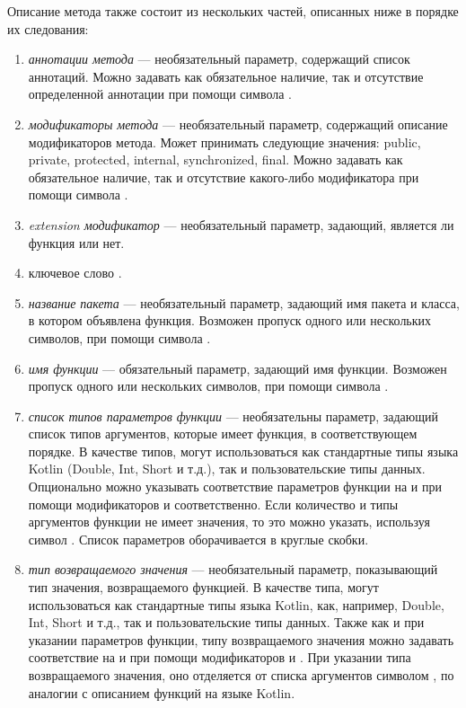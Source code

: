 Описание метода также состоит из нескольких частей, описанных ниже в порядке их
следования:
\begin{enumerate}
	\item \textit{аннотации метода} --- необязательный параметр, содержащий
		  список аннотаций.
		  Можно задавать как обязательное наличие, так и отсутствие определенной
		  аннотации при помощи символа \quotes{!}.
	\item \textit{модификаторы метода} --- необязательный параметр, содержащий
		  описание модификаторов метода.
		  Может принимать следующие значения: public, private, protected,
		  internal, synchronized, final.
		  Можно задавать как обязательное наличие, так и отсутствие какого-либо
		  модификатора при помощи символа \quotes{!}.
	\item \textit{extension модификатор} --- необязательный параметр, задающий,
		  является ли функция  или нет.
	\item ключевое слово .
	\item \textit{название пакета} --- необязательный параметр, задающий имя
		  пакета и класса, в котором объявлена функция.
		  Возможен пропуск одного или нескольких символов, при помощи символа
		  \quotes{*}.
	\item \textit{имя функции} --- обязательный параметр, задающий имя функции.
		  Возможен пропуск одного или нескольких символов, при помощи символа
		  \quotes{*}.
	\item \textit{список типов параметров функции} --- необязательны параметр,
		  задающий список типов аргументов, которые имеет функция, в
		  соответствующем порядке.
		  В качестве типов, могут использоваться как стандартные типы языка
		  Kotlin (Double, Int, Short и т.д.), так и
		  пользовательские типы данных.
		  Опционально можно указывать соответствие параметров функции на
		   и  при помощи модификаторов
		  \quotes{!!} и  соответственно.
		  Если количество и типы аргументов функции не имеет значения, то это
		  можно указать, используя символ .
		  Список параметров оборачивается в круглые скобки.
	\item \textit{тип возвращаемого значения} --- необязательный параметр,
		  показывающий тип значения, возвращаемого функцией.
		  В качестве типа, могут использоваться как стандартные типы языка
		  Kotlin, как, например, Double, Int, Short и т.д., так и
		  пользовательские типы данных.
		  Также как и при указании параметров функции, типу возвращаемого
		  значения можно задавать соответствие на  и
		   при помощи модификаторов \quotes{!!} и .
		  При указании типа возвращаемого значения, оно отделяется от списка
		  аргументов символом \quotes{:}, по аналогии с описанием функций на
		  языке Kotlin.
\end{enumerate}

